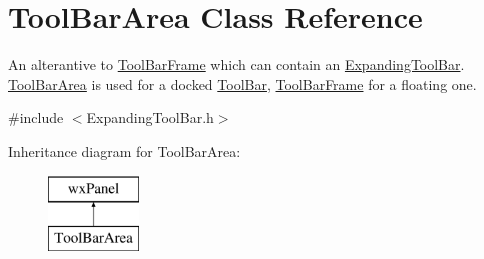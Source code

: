 \hypertarget{class_tool_bar_area}{}\section{Tool\+Bar\+Area Class Reference}
\label{class_tool_bar_area}


An alterantive to \hyperlink{class_tool_bar_frame}{Tool\+Bar\+Frame} which can contain an \hyperlink{class_expanding_tool_bar}{Expanding\+Tool\+Bar}. \hyperlink{class_tool_bar_area}{Tool\+Bar\+Area} is used for a \textquotesingle{}docked\textquotesingle{} \hyperlink{class_tool_bar}{Tool\+Bar}, \hyperlink{class_tool_bar_frame}{Tool\+Bar\+Frame} for a floating one.  




{\ttfamily \#include $<$Expanding\+Tool\+Bar.\+h$>$}

Inheritance diagram for Tool\+Bar\+Area\+:\begin{figure}[H]
\begin{center}
\leavevmode
\includegraphics[height=2.000000cm]{class_tool_bar_area}
\end{center}
\end{figure}
